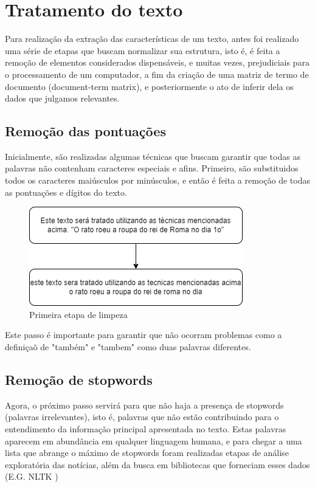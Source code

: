 \documentclass[conference]{IEEEtran}
\begin{document}
\section{Tratamento do texto}
Para realização da extração das características de um texto, antes foi realizado uma série de etapas que buscam normalizar sua estrutura, isto é, é feita a remoção de elementos considerados dispensáveis, e muitas vezes, prejudiciais para o processamento de um computador, a fim da criação de uma matriz de termo de documento (document-term matrix), e posteriormente o ato de inferir dela os dados que julgamos relevantes.

\subsection{Remoção das pontuações}\label{AA}
Inicialmente, são realizadas algumas técnicas que buscam garantir que todas as palavras não contenham caracteres especiais e afins. Primeiro, são substituidos todos os caracteres maiúsculos por minúsculos, e então é feita a remoção de todas as pontuações e dígitos do texto.

\begin{figure}[htbp]
\centerline{\includegraphics[scale=0.5]{figura1.png}}
\caption{Primeira etapa de limpeza}
\label{fig}
\end{figure}

Este passo é importante para garantir que não ocorram problemas como a definiçaõ de "também" e "tambem" como duas palavras diferentes.


\subsection{Remoção de stopwords}
Agora, o próximo passo servirá para que não haja a presença de stopwords (palavras irrelevantes), isto é, palavras que não estão contribuindo para o entendimento da informação principal apresentada no texto. Estas palavras aparecem em abundância em qualquer linguagem humana, e para chegar a uma lista que abrange o máximo de stopwords foram realizadas etapas de análise exploratória das notícias, além da busca em bibliotecas que forneciam esses dados (E.G. NLTK \cite{b6})
\end{document}
